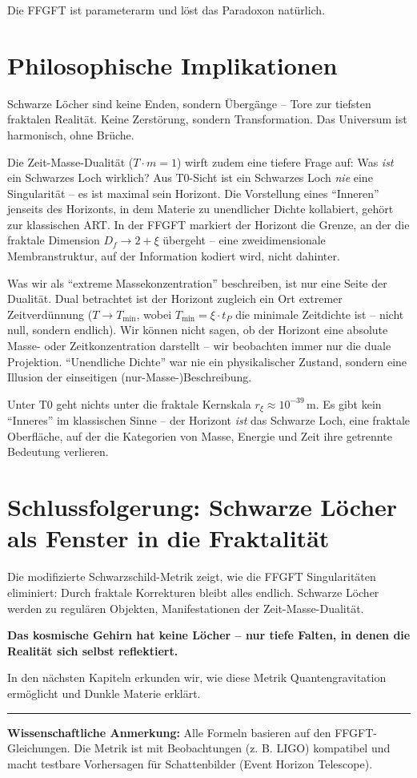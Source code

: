 	Die FFGFT ist parameterarm und löst das Paradoxon natürlich.
	
	\section{Philosophische Implikationen}
	
	Schwarze Löcher sind keine Enden, sondern Übergänge -- Tore zur tiefsten fraktalen Realität. Keine Zerstörung, sondern Transformation. Das Universum ist harmonisch, ohne Brüche.
	
	Die Zeit-Masse-Dualität ($T \cdot m = 1$) wirft zudem eine tiefere Frage auf: Was \textit{ist} ein Schwarzes Loch wirklich? Aus T0-Sicht ist ein Schwarzes Loch \textit{nie} eine Singularität -- es ist maximal sein Horizont. Die Vorstellung eines \enquote{Inneren} jenseits des Horizonts, in dem Materie zu unendlicher Dichte kollabiert, gehört zur klassischen ART. In der FFGFT markiert der Horizont die Grenze, an der die fraktale Dimension $D_f \to 2 + \xi$ übergeht -- eine zweidimensionale Membranstruktur, auf der Information kodiert wird, nicht dahinter.
	
	Was wir als \enquote{extreme Massekonzentration} beschreiben, ist nur eine Seite der Dualität. Dual betrachtet ist der Horizont zugleich ein Ort extremer Zeitverdünnung ($T \to T_{\min}$, wobei $T_{\min} = \xi \cdot t_P$ die minimale Zeitdichte ist -- nicht null, sondern endlich). Wir können nicht sagen, ob der Horizont eine absolute Masse- oder Zeitkonzentration darstellt -- wir beobachten immer nur die duale Projektion. \enquote{Unendliche Dichte} war nie ein physikalischer Zustand, sondern eine Illusion der einseitigen (nur-Masse-)Beschreibung.
	
	Unter T0 geht nichts unter die fraktale Kernskala $r_\xi \approx 10^{-39}\,$m. Es gibt kein \enquote{Inneres} im klassischen Sinne -- der Horizont \textit{ist} das Schwarze Loch, eine fraktale Oberfläche, auf der die Kategorien von Masse, Energie und Zeit ihre getrennte Bedeutung verlieren.
	
	\section{Schlussfolgerung: Schwarze Löcher als Fenster in die Fraktalität}
	
	Die modifizierte Schwarzschild-Metrik zeigt, wie die FFGFT Singularitäten eliminiert: Durch fraktale Korrekturen bleibt alles endlich. Schwarze Löcher werden zu regulären Objekten, Manifestationen der Zeit-Masse-Dualität.
	
	\textbf{Das kosmische Gehirn hat keine Löcher – nur tiefe Falten, in denen die Realität sich selbst reflektiert.}
	
	In den nächsten Kapiteln erkunden wir, wie diese Metrik Quantengravitation ermöglicht und Dunkle Materie erklärt.
	
	\vspace{1cm}
	\hrule
	\vspace{0.5cm}
	\noindent\textbf{Wissenschaftliche Anmerkung:} Alle Formeln basieren auf den FFGFT-Gleichungen. Die Metrik ist mit Beobachtungen (z. B. LIGO) kompatibel und macht testbare Vorhersagen für Schattenbilder (Event Horizon Telescope).




